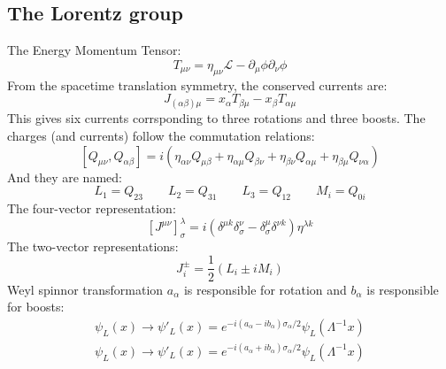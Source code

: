 \documentclass{article}
\begin{document}
\subsection{The Lorentz group}
The Energy Momentum Tensor:
\begin{equation*}
    T_{\mu\nu} = \eta_{\mu\nu}\mathcal{L} - \partial_\mu\phi\partial_\nu\phi
\end{equation*}
From the spacetime translation symmetry, the conserved currents are:
\begin{equation*}
    J_{(\alpha\beta)\mu} = x_\alpha T_{\beta\mu} - x_\beta T_{\alpha\mu}
\end{equation*}
This gives six currents corrsponding to three rotations and three boosts. The charges (and currents) follow the commutation relations:
\begin{equation}
    \left[Q_{\mu\nu}, Q_{\alpha\beta}\right] = i\left(
        \eta_{\alpha\nu}Q_{\mu\beta} +
        \eta_{\alpha\mu}Q_{\beta\nu} +
        \eta_{\beta\nu}Q_{\alpha\mu} +
        \eta_{\beta\mu}Q_{\nu\alpha}
    \right)
\end{equation}
And they are named:
\begin{equation*}
    L_1 = Q_{23}
    \qquad
    L_2 = Q_{31}
    \qquad
    L_3 = Q_{12}
    \qquad
    M_i = Q_{0i}
\end{equation*}
The four-vector representation:
\begin{equation*}
    \left[J^{\mu\nu}\right]^\lambda_\sigma = i\left(
        \delta^{\mu k}\delta^\nu_\sigma - \delta^\mu_\sigma \delta^{\nu k}
    \right)\eta^{\lambda k}
\end{equation*}
The two-vector representations:
\begin{equation*}
    J_i^{\pm} = \frac{1}{2}\left(L_i \pm iM_i\right)
\end{equation*}
Weyl spinnor transformation $a_\alpha$ is responsible for rotation and $b_\alpha$ is responsible for boosts:
\begin{equation*}
\begin{gathered}
    \psi_L(x) \rightarrow \psi'_L(x) = e^{-i\left(a_\alpha - i b_\alpha\right)\sigma_\alpha / 2} \psi_L(\Lambda^{-1}x)
    \\
    \psi_L(x) \rightarrow \psi'_L(x) = e^{-i\left(a_\alpha + i b_\alpha\right)\sigma_\alpha / 2} \psi_L(\Lambda^{-1}x)
\end{gathered}
\end{equation*}
\end{document}
